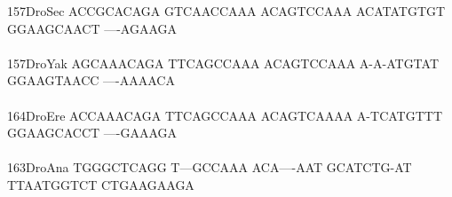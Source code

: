 \documentclass[11pt,twoside,reqno,a4paper]{article}
\begin{document}
{157\hspace*{2\charwidth}DroSec	ACCGCACAGA	GTCAACCAAA	ACAGTCCAAA	ACATATGTGT	GGAAGCAACT	----AGAAGA	\\
\hspace*{5\charwidth}\hspace*{7\charwidth}\hspace*{1\charwidth}\hspace*{1\charwidth}\hspace*{1\charwidth}\hspace*{1\charwidth}\hspace*{1\charwidth}\hspace*{1\charwidth}\\
157\hspace*{2\charwidth}DroYak	AGCAAACAGA	TTCAGCCAAA	ACAGTCCAAA	A-A-ATGTAT	GGAAGTAACC	----AAAACA	\\
\hspace*{5\charwidth}\hspace*{7\charwidth}\hspace*{1\charwidth}\hspace*{1\charwidth}\hspace*{1\charwidth}\hspace*{1\charwidth}\hspace*{1\charwidth}\hspace*{1\charwidth}\\
164\hspace*{2\charwidth}DroEre	ACCAAACAGA	TTCAGCCAAA	ACAGTCAAAA	A-TCATGTTT	GGAAGCACCT	----GAAAGA	\\
\hspace*{5\charwidth}\hspace*{7\charwidth}\hspace*{1\charwidth}\hspace*{1\charwidth}\hspace*{1\charwidth}\hspace*{1\charwidth}\hspace*{1\charwidth}\hspace*{1\charwidth}\\
163\hspace*{2\charwidth}DroAna	TGGGCTCAGG	T---GCCAAA	ACA----AAT	GCATCTG-AT	TTAATGGTCT	CTGAAGAAGA	\\
\hspace*{5\charwidth}\hspace*{7\charwidth}\hspace*{1\charwidth}\hspace*{1\charwidth}\hspace*{1\charwidth}\hspace*{1\charwidth}\hspace*{1\charwidth}\hspace*{1\charwidth}\\
}
\end{document}
